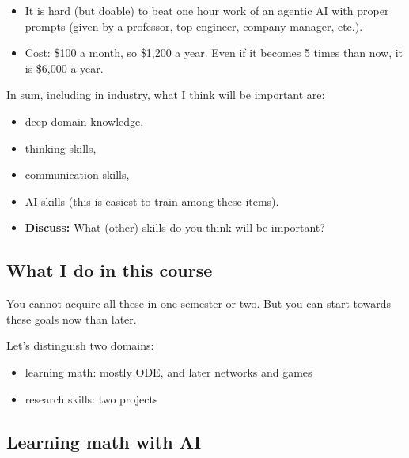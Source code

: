 \documentclass[20pt]{extarticle}
\begin{document}
	\begin{itemize}
	\item It is hard (but doable) to beat one hour work of an agentic AI with proper prompts (given by a professor, top engineer, company manager, etc.).
	\item Cost: \$100 a month, so \$1,200 a year. Even if it becomes 5 times than now, it is \$6,000 a year.
	\end{itemize}
In sum, including in industry, what I think will be important are:
\begin{itemize}
\item deep domain knowledge,
\item thinking skills,
\item communication skills,
\item AI skills (this is easiest to train among these items).
\item \textbf{Discuss:} What (other) skills do you think will be important?
\end{itemize}
	
\subsection*{What I do in this course}

You cannot acquire all these in one semester or two. But you can start towards these goals now than later.

\noindent Let's distinguish two domains:
\begin{itemize}
\item learning math: mostly ODE, and later networks and games
\item research skills: two projects
\end{itemize}

\subsection*{Learning math with AI}
\end{document}
